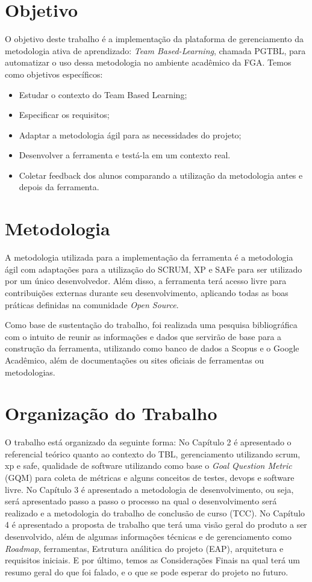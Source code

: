 \section{Objetivo}

O objetivo deste trabalho é a implementação da plataforma de gerenciamento da metodologia ativa de aprendizado: \textit{Team Based-Learning}, chamada PGTBL, para automatizar o uso dessa metodologia no ambiente acadêmico da FGA. Temos como objetivos específicos:

\begin{itemize}
  \item Estudar o contexto do Team Based Learning;
  \item Especificar os requisitos;
  \item Adaptar a metodologia ágil para as necessidades do projeto;
  \item Desenvolver a ferramenta e testá-la em um contexto real.
  \item Coletar feedback dos alunos comparando a utilização da metodologia antes e depois da ferramenta.
\end{itemize}

\section{Metodologia}

A metodologia utilizada para a implementação da ferramenta é a metodologia ágil com adaptações para a utilização do SCRUM, XP e SAFe para ser utilizado por um único desenvolvedor. Além disso, a ferramenta terá acesso livre para contribuições externas durante seu desenvolvimento, aplicando todas as boas práticas definidas na comunidade \textit{Open Source}.

Como base de sustentação do trabalho, foi realizada uma pesquisa bibliográfica com o intuito de reunir as informações e dados que servirão de base para a construção da ferramenta, utilizando como banco de dados a Scopus e o Google Acadêmico, além de documentações ou sites oficiais de ferramentas ou metodologias.

\section{Organização do Trabalho}

O trabalho está organizado da seguinte forma: No Capítulo 2 é apresentado o referencial teórico quanto ao contexto do TBL, gerenciamento utilizando scrum, xp e safe, qualidade de software utilizando como base o \textit{Goal Question Metric} (GQM) para coleta de métricas e alguns conceitos de testes, devops e software livre. No Capítulo 3 é apresentado a metodologia de desenvolvimento, ou seja, será apresentado passo a passo o processo na qual o desenvolvimento será realizado e a metodologia do trabalho de conclusão de curso (TCC). No Capítulo 4 é apresentado a proposta de trabalho que terá uma visão geral do produto a ser desenvolvido, além de algumas informações técnicas e de gerenciamento como \textit{Roadmap}, ferramentas, Estrutura análitica do projeto (EAP), arquitetura e requisitos iniciais. E por último, temos as Considerações Finais na qual terá um resumo geral do que foi falado, e o que se pode esperar do projeto no futuro.
